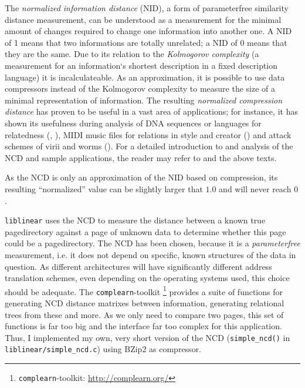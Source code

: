 The \emph{normalized information distance} (NID), a form of parameterfree
similarity distance measurement, can be understood as a measurement for the
minimal amount of changes required to change one information into another one.
A NID of 1 means that two informations are totally unrelated; a NID of 0 means
that they are the same.  Due to its relation to the \emph{Kolmogorov complexity}
(a measurement for an information`s shortest description in a fixed description
language) it is incalculateable.  As an approximation, it is possible to use
data compressors instead of the Kolmogorov complexity to measure the size of a
minimal representation of information. The resulting \emph{normalized
compression distance} has proven to be useful in a vast area of applications;
for instance, it has shown its usefulness during analysis of DNA sequences or
languages for relatedness (\cite{clustering_by_compression:2005},
\cite{similarity_matrix:2004}), MIDI music files for relations in style and
creator (\cite{clustering_by_compression:2005}) and attack schemes of virii and
worms (\cite{analysing_worms_with_ncd:2006}).  For a detailed introduction to
and analysis of the NCD and sample applications, the reader may refer to
\cite{kolmogorov:1997} and the above texts.

As the NCD is only an approximation of the NID based on compression, its
resulting ``normalized'' value can be slightly larger that $1.0$ and will never
reach $0$.

\texttt{liblinear} uses the NCD to measure the distance between a known true
pagedirectory against a page of unknown data to determine whether this page
could be a pagedirectory. The NCD has been chosen, because it is a
\emph{parameterfree} measurement, i.e. it does not depend on specific, known
structures of the data in question. As different architectures will have
significantly different address translation schemes, even depending on the
operating systems used, this choice should be adequate. The
\texttt{complearn}-toolkit \footnote{\texttt{complearn}-toolkit:
\href{http://complearn.org/}{http://complearn.org/}} provides a suite of
functions for generating NCD distance matrixes between information, generating
relational trees from these and more.  As we only need to compare two pages,
this set of functions is far too big and the interface far too complex for this
application.  Thus, I implemented my own, very short version of the NCD
(\texttt{simple\_ncd()} in \texttt{liblinear/simple\_ncd.c}) using BZip2 as
compressor.


